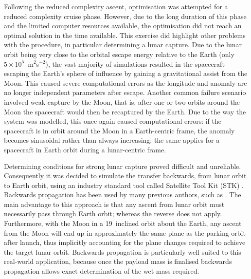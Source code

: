 
Following the reduced complexity ascent, optimisation was attempted for a reduced complexity cruise phase. However, due to the long duration of this phase and the limited computer resources available, the optimisation did not reach an optimal solution in the time available. This exercise did highlight other problems with the procedure, in particular determining a lunar capture. Due to the lunar orbit being very close to the orbital escape energy relative to the Earth (only $5\times10^5$~m$^2$s$^{-2}$), the vast majority of simulations resulted in the spacecraft escaping the Earth's sphere of influence by gaining a gravitational assist from the Moon. This caused severe computational errors as the longitude and anomaly are no longer independent parameters after escape. Another common failure scenario involved weak capture by the Moon, that is, after one or two orbits around the Moon the spacecraft would then be recaptured by the Earth. Due to the way the system was modelled, this once again caused computational errors: if the spacecraft is in orbit around the Moon in a Earth-centric frame, the anomaly becomes sinusoidal rather than always increasing; the same applies for a spacecraft in Earth orbit during a lunar-centric frame.

Determining conditions for strong lunar capture proved difficult and unreliable. Consequently it was decided to simulate the transfer backwards, from lunar orbit to Earth orbit, using an industry standard tool called Satellite Tool Kit (STK) \parencite{STK}. Backwards propagation has been used by many previous authors, such as \textcite{Kluever1995}. The main advantage to this approach is that any ascent from lunar orbit must necessarily pass through Earth orbit; whereas the reverse does not apply. Furthermore, with the Moon in a 19\degrees\ inclined orbit about the Earth, any ascent from the Moon will end up in approximately the same plane as the parking orbit after launch, thus implicitly accounting for the plane changes required to achieve the target lunar orbit. Backwards propagation is particularly well suited to this real-world application, because once the payload mass is finalised backwards propagation allows exact determination of the wet mass required.

\clearpage


